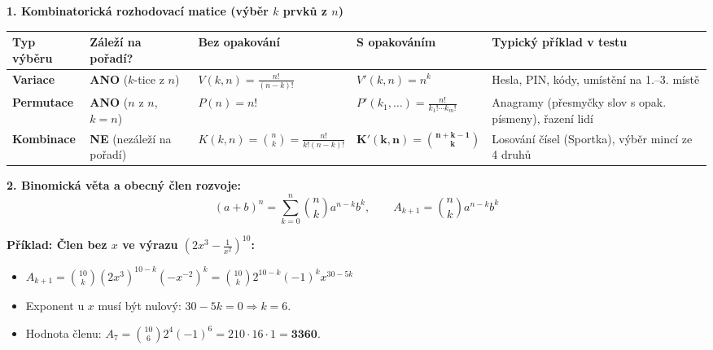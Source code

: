 \documentclass[9pt,a4paper]{article}
\begin{document}
\begin{tcolorbox}[secbox,title=OKRUHY 24--25: KOMBINATORIKA A BINOMICKÁ VĚTA]

\textbf{1. Kombinatorická rozhodovací matice (výběr $k$ prvků z $n$)}
\vspace{1mm}

\begin{center}
\renewcommand{\arraystretch}{1.2}
\setlength{\tabcolsep}{4pt}
{\footnotesize
\begin{tabularx}{\linewidth}{l l l l X}
\toprule
\textbf{Typ výběru} & \textbf{Záleží na pořadí?} & \textbf{Bez opakování} & \textbf{S opakováním} & \textbf{Typický příklad v testu} \\
\midrule
\textbf{Variace} & \textbf{ANO} ($k$-tice z $n$) & $V(k,n) = \frac{n!}{(n-k)!}$ & $V'(k,n) = n^k$ & Hesla, PIN, kódy, umístění na 1.--3. místě \\
\textbf{Permutace} & \textbf{ANO} ($n$ z $n$, $k=n$) & $P(n) = n!$ & $P'(k_1,\dots) = \frac{n!}{k_1! \cdots k_m!}$ & Anagramy (přesmyčky slov s opak. písmeny), řazení lidí \\
\textbf{Kombinace} & \textbf{NE} (nezáleží na pořadí) & $K(k,n) = \binom{n}{k} = \frac{n!}{k!(n-k)!}$ & $\mathbf{K'(k,n) = \binom{n+k-1}{k}}$ & Losování čísel (Sportka), výběr mincí ze 4 druhů \\
\bottomrule
\end{tabularx}}
\end{center}

\vspace{1mm}

\begin{multicols}{2}

\textbf{2. Binomická věta a obecný člen rozvoje:}
\[(a + b)^n = \sum_{k=0}^n \binom{n}{k} a^{n-k} b^k, \qquad A_{k+1} = \binom{n}{k} a^{n-k} b^k\]

\textbf{Příklad: Člen bez $x$ ve výrazu $\left(2x^3 - \frac{1}{x^2}\right)^{10}$:}
\begin{itemize}
  \item $A_{k+1} = \binom{10}{k} (2x^3)^{10-k} (-x^{-2})^k = \binom{10}{k} 2^{10-k} (-1)^k x^{30-5k}$
  \item Exponent u $x$ musí být nulový: $30 - 5k = 0 \Rightarrow k = 6$.
  \item Hodnota členu: $A_7 = \binom{10}{6} 2^4 (-1)^6 = 210 \cdot 16 \cdot 1 = \mathbf{3360}$.
\end{itemize}


\end{multicols}
\end{tcolorbox}
\end{document}
